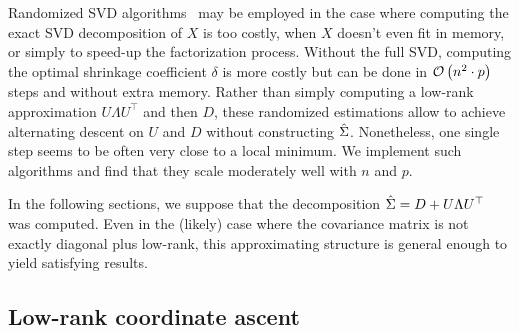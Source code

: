 Randomized SVD algorithms~\citep{random_svd} may be employed
in the case where computing the exact SVD decomposition of $X$ is too costly,
when $X$ doesn't even fit in memory,
or simply to speed-up the factorization process.
Without the full SVD, computing the optimal shrinkage coefficient $\delta$ is more costly
but can be done in $\mathcal{O}\left( n^2 \cdot p \right)$ steps and without extra memory.
Rather than simply computing a low-rank approximation $U \Lambda U^\top$ and then $D$,
these randomized estimations allow to achieve alternating descent on $U$ and $D$ without constructing $\hat{\Sigma}$.
Nonetheless, one single step seems to be often very close to a local minimum.
We implement such algorithms and find that they scale moderately well with $n$ and $p$.

\bigbreak
In the following sections,
we suppose that the decomposition $\hat{\Sigma} = D + U \Lambda U^\top$
was computed.
Even in the (likely) case where the covariance matrix is not exactly diagonal plus low-rank,
this approximating structure is general enough to yield satisfying results.

\subsection{Low-rank coordinate ascent}\label{subsec:low_rank_sdp}

